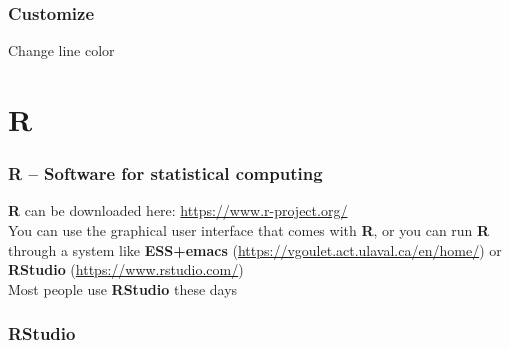 \documentclass[color=usenames,dvipsnames]{beamer}\usepackage[]{graphicx}\usepackage[]{color}
\begin{document}
\begin{frame}
  \frametitle{Customize}
    \begin{center}
      Change line color
    \end{center}
\end{frame}



\section{R}


\begin{frame}[fragile]
  \frametitle{R -- Software for statistical computing}
  {\bf R} can be downloaded here: \url{https://www.r-project.org/} \\
  \pause
  \vfill
  You can use the graphical user interface that comes with {\bf R}, or you
  can run {\bf R} through a system like {\bf ESS+emacs}
  (\url{https://vgoulet.act.ulaval.ca/en/home/}) or {\bf RStudio}
  (\url{https://www.rstudio.com/}) \\
  \pause
  \vfill
  Most people use {\bf RStudio} these days
\end{frame}


\begin{frame}
  \frametitle{RStudio}
\end{frame}
\end{document}

